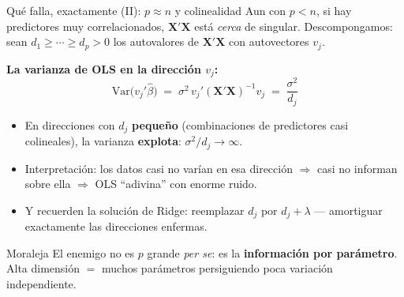 \documentclass{beamer}
\newcommand{\Var}{\mathrm{Var}}
\newcommand{\1}{\mathbb{I}}
\begin{document}
\begin{frame}{Qué falla, exactamente (II): $p \approx n$ y colinealidad}
\small
Aun con $p < n$, si hay predictores muy correlacionados, $\mathbf{X}'\mathbf{X}$ está \emph{cerca} de singular. Descompongamos: sean $d_1 \geq \cdots \geq d_p > 0$ los autovalores de $\mathbf{X}'\mathbf{X}$ con autovectores $v_j$.
\pause

\vspace{0.1cm}
\textbf{La varianza de OLS en la dirección $v_j$:}
\[ \Var\big( v_j'\hat{\beta} \big) \;=\; \sigma^2\, v_j' (\mathbf{X}'\mathbf{X})^{-1} v_j \;=\; \frac{\sigma^2}{d_j} \]
\pause

\begin{itemize}\itemsep5pt
  \item En direcciones con $d_j$ \textbf{pequeño} (combinaciones de predictores casi colineales), la varianza \textbf{explota}: $\sigma^2 / d_j \to \infty$.
  \item Interpretación: los datos casi no varían en esa dirección $\Rightarrow$ casi no informan sobre ella $\Rightarrow$ OLS ``adivina'' con enorme ruido. \pause
  \item Y recuerden la solución de Ridge: reemplazar $d_j$ por $d_j + \lambda$ --- amortiguar exactamente las direcciones enfermas.
\end{itemize}
\pause

\begin{block}{Moraleja}
El enemigo no es $p$ grande \emph{per se}: es la \textbf{información por parámetro}. Alta dimensión $=$ muchos parámetros persiguiendo poca variación independiente.
\end{block}
\end{frame}
\end{document}
